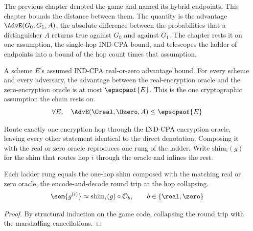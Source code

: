The previous chapter denoted the game and named its hybrid endpoints. This
chapter bounds the distance between them. The quantity is the \ssprove{}
advantage $\AdvE(G_0,G_1,A)$, the absolute difference between the probabilities
that a distinguisher $A$ returns true against $G_0$ and against $G_1$. The chapter
rests it on one assumption, the single-hop IND-CPA bound, and telescopes the
ladder of endpoints into a bound of the hop count times that assumption.

\begin{definition}
  \label{def:indcpa_assumption}
  \rocqok
  A scheme $E$'s assumed IND-CPA real-or-zero advantage bound. For every scheme
  and every adversary, the advantage between the real-encryption oracle and the
  zero-encryption oracle is at most $\epscpaof{E}$. This is the one cryptographic
  assumption the chain rests on.
  \[ \forall E,\quad \AdvE(\Oreal, \Ozero, A) \le \epscpaof{E} \]
\end{definition}

\begin{definition}
  \label{def:denote_game_shim}
  \rocqok
  Route exactly one encryption hop through the IND-CPA encryption oracle, leaving
  every other statement identical to the direct denotation. Composing it with the
  real or zero oracle reproduces one rung of the ladder. Write $\mathrm{shim}_i(g)$
  for the shim that routes hop $i$ through the oracle and inlines the rest.
\end{definition}

\begin{lemma}
  \label{lem:hop_equiv}
  \rocqok
  Each ladder rung equals the one-hop shim composed with the matching real or
  zero oracle, the encode-and-decode round trip at the hop collapsing.
  \[ \sem{g^{(i)}} \approx \mathrm{shim}_i(g) \circ \mathcal{O}_b, \qquad
        b \in \{\real, \zero\} \]
\end{lemma}
\begin{proof}
  \rocqok
  By structural induction on the game code, collapsing the round trip with the
  marshalling cancellations.
\end{proof}


